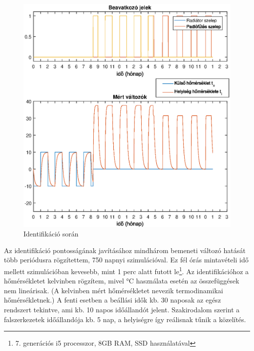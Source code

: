 


\begin{figure}[H]
	\centering
	\includegraphics[trim=0 0 0 0, clip,width=\textwidth]{figures/ident-valve3}
	\caption{Identifikáció során }
	\label{fig:ident}
\end{figure}

Az identifikáció pontosságának javításához mindhárom bemeneti változó hatását több periódusra rögzítettem, 750 napnyi szimulációval. Ez fél órás mintavételi idő mellett szimulációban kevesebb, mint 1 perc alatt futott le\footnote{7. generációs i5 processzor, 8GB RAM, SSD használatával}. Az identifikációhoz a hőmérsékletet kelvinben rögzítem, mivel \si{\celsius} használata esetén az összefüggések nem lineárisak. (A kelvinben mért hőmérsékletet nevezik termodinamikai hőmérsékletnek.) A fenti esetben a beállási idők kb. 30 naposak az egész rendszert tekintve, ami kb. 10 napos időállandót jelent. Szakirodalom szerint a falszerkezetek időállandója kb. 5 nap, a helyiségre így reálisnak tűnik a közelítés.

